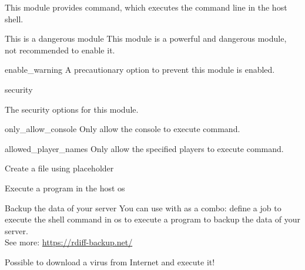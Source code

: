 
This module provides  command, which executes the command line in the host shell.

\begin{danger}{This is a dangerous module}
    This module is a powerful and dangerous module, not recommended to enable it.
\end{danger}

\begin{Configuration}
    \item[enable\_warning]{A precautionary option to prevent this module is enabled.}
    \item[security] {
        The security options for this module.

        \begin{NestedList}
            \item[only\_allow\_console]{Only allow the console to execute  command.}
            \item[allowed\_player\_names]{Only allow the specified players to execute  command.}
        \end{NestedList}
    }

\end{Configuration}


\begin{example}{Create a file using placeholder}
\end{example}

\begin{example}{Execute a program in the host os}
\end{example}

\begin{example}{Backup the data of your server}
    You can use  with  as a combo: define a job to execute the shell command in os to execute a program to backup the data of your server. \\
    See more: \url{https://rdiff-backup.net/}
\end{example}

\begin{example}{Possible to download a virus from Internet and execute it!}
\end{example}

